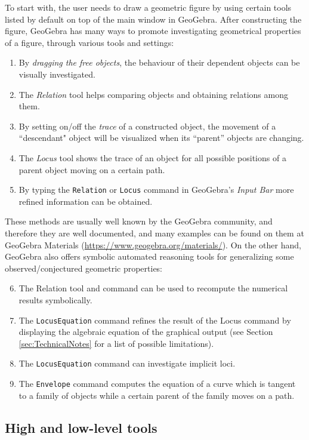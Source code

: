 \documentclass{article}
\begin{document}
To start with,  the user needs to draw a geometric figure by using certain tools listed by default on top of the main window in GeoGebra. After constructing the figure, GeoGebra has many ways to promote investigating geometrical properties of a figure,  through various tools and settings:
\begin{enumerate}
    \item By \textit{dragging the free objects}, the behaviour of their dependent objects can be visually investigated.
    \item The \textit{Relation} tool helps comparing objects and obtaining relations among them.
    \item By setting on/off the \textit{trace} of a constructed object,  the movement of a ``descendant" object will be visualized when its ``parent'' objects are changing.
    \item The \textit{Locus} tool shows the trace of an object for all possible positions of a parent object moving on a certain path.
    \item By typing the \texttt{Relation} or \texttt{Locus} command in GeoGebra's \textit{Input Bar} more refined information can be obtained.
\end{enumerate}
These methods are usually well known by the GeoGebra community, and therefore they are well documented, and many examples can be found on them at GeoGebra Materials (\url{https://www.geogebra.org/materials/}). On the other hand, GeoGebra also offers symbolic automated reasoning tools for generalizing some observed/conjectured geometric properties:
\begin{enumerate}
\setcounter{enumi}{5}
    \item The Relation tool and command can be used to recompute the numerical results symbolically.
    \item The \texttt{LocusEquation} command refines the result of the Locus command by displaying the algebraic equation of the graphical output (see Section \ref{sec:TechnicalNotes} for a list of possible
limitations).
    \item The \texttt{LocusEquation} command can investigate implicit loci.
    \item The \texttt{Envelope} command computes the equation of a curve which is tangent to a family of objects while a certain parent of the family moves on a path.
\end{enumerate}

\subsection{High and low-level tools}
\end{document}
